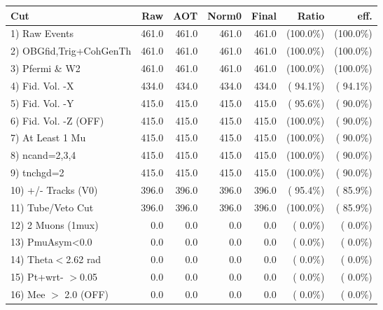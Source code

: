  \begin{table}[h!]\centering
 \begin{tabular}{||l||r|r|r|r|r|r||}
 \hline
 \hline
 Cut & Raw & AOT & Norm0 & Final & Ratio & eff.       \\
 \hline
  1) Raw Events           &        461.0 &        461.0 &        461.0 &        461.0 & (100.0\%) & (100.0\%) \\
  2) OBGfid,Trig+CohGenTh &        461.0 &        461.0 &        461.0 &        461.0 & (100.0\%) & (100.0\%) \\
  3) Pfermi \& W2         &        461.0 &        461.0 &        461.0 &        461.0 & (100.0\%) & (100.0\%) \\
  4) Fid. Vol. -X         &        434.0 &        434.0 &        434.0 &        434.0 & ( 94.1\%) & ( 94.1\%) \\
  5) Fid. Vol. -Y         &        415.0 &        415.0 &        415.0 &        415.0 & ( 95.6\%) & ( 90.0\%) \\
  6) Fid. Vol. -Z (OFF)   &        415.0 &        415.0 &        415.0 &        415.0 & (100.0\%) & ( 90.0\%) \\
  7) At Least 1 Mu        &        415.0 &        415.0 &        415.0 &        415.0 & (100.0\%) & ( 90.0\%) \\
  8) ncand=2,3,4          &        415.0 &        415.0 &        415.0 &        415.0 & (100.0\%) & ( 90.0\%) \\
  9) tnchgd=2             &        415.0 &        415.0 &        415.0 &        415.0 & (100.0\%) & ( 90.0\%) \\
 10) +/- Tracks (V0)      &        396.0 &        396.0 &        396.0 &        396.0 & ( 95.4\%) & ( 85.9\%) \\
 11) Tube/Veto Cut        &        396.0 &        396.0 &        396.0 &        396.0 & (100.0\%) & ( 85.9\%) \\
 12) 2 Muons (1mux)       &          0.0 &          0.0 &          0.0 &          0.0 & (  0.0\%) & (  0.0\%) \\
 13) PmuAsym<0.0          &          0.0 &          0.0 &          0.0 &          0.0 & (  0.0\%) & (  0.0\%) \\
 14) Theta$<$2.62 rad     &          0.0 &          0.0 &          0.0 &          0.0 & (  0.0\%) & (  0.0\%) \\
 15) Pt+wrt- $>$0.05      &          0.0 &          0.0 &          0.0 &          0.0 & (  0.0\%) & (  0.0\%) \\
 16) Mee $>$ 2.0  (OFF)   &          0.0 &          0.0 &          0.0 &          0.0 & (  0.0\%) & (  0.0\%) \\

\end{tabular}
\end{table}
